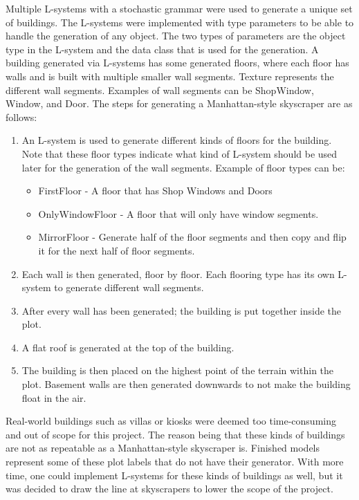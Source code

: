 Multiple L-systems with a stochastic grammar were used to generate a unique set of buildings. 
The L-systems were implemented with type parameters to be able to handle the generation of any object.
The two types of parameters are the object type in the L-system and the data class that is used for the generation.
A building generated via L-systems has some generated floors, where each floor has walls and is built with multiple smaller wall segments. 
Texture represents the different wall segments.
Examples of wall segments can be ShopWindow, Window, and Door.
The steps for generating a Manhattan-style skyscraper are as follows:
\begin{enumerate}
    \item An L-system is used to generate different kinds of floors for the building. Note that these floor types indicate what kind of L-system should be used later for the generation of the wall segments. Example of floor types can be:
    \begin{itemize}
        \item FirstFloor - A floor that has Shop Windows and Doors
        \item OnlyWindowFloor - A floor that will only have window segments. 
        \item MirrorFloor - Generate half of the floor segments and then copy and flip it for the next half of floor segments.
    \end{itemize}
    \item Each wall is then generated, floor by floor. Each flooring type has its own L-system to generate different wall segments.
    \item After every wall has been generated; the building is put together inside the plot.
    \item A flat roof is generated at the top of the building.
    \item The building is then placed on the highest point of the terrain within the plot. Basement walls are then generated downwards to not make the building float in the air. %
\end{enumerate}


Real-world buildings such as villas or kiosks were deemed too time-consuming and out of scope for this project.
The reason being that these kinds of buildings are not as repeatable as a Manhattan-style skyscraper is. 
Finished models represent some of these plot labels that do not have their generator.
With more time, one could implement L-systems for these kinds of buildings as well, but it was decided to draw the line at skyscrapers to lower the scope of the project.
